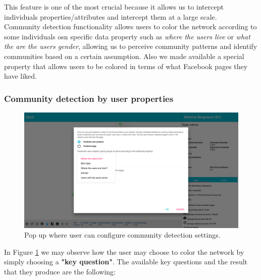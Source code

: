 This feature is one of the most crucial because it allows us to intercept individuals properties/attributes and intercept them at a large scale.\\
\indent Community detection functionality allows users to color the network according to some individuals \gls{osn} specific data property such as \textit{where the users live} or \textit{what the are the users gender}, allowing us to perceive community patterns and identify communities based on a certain assumption. Also we made available a special property that allows users to be colored in terms of what Facebook pages they have liked.

\subsubsection*{Community detection by user properties}

\begin{figure}[h!]
\begin{center}
  \hspace*{-0.8in}
  \includegraphics[width=1.2\textwidth]{img/socii/socii_8.png}
\end{center}
\caption{\label{img:socii_8} Pop up where user can configure community detection settings.}
\end{figure}

In Figure \ref{img:socii_8} we may observe how the user may choose to color the network by simply choosing a \textbf{"key question"}. The available key questions and the result that they produce are the following:

